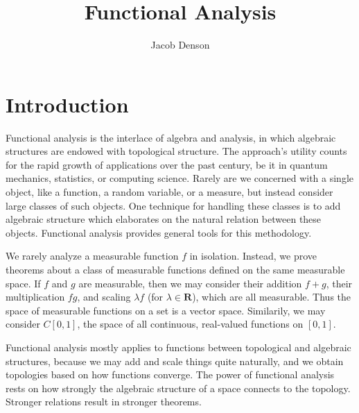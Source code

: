 

\title{Functional Analysis}
\author{Jacob Denson}



\maketitle
\tableofcontents
{}

\chapter{Introduction}

Functional analysis is the interlace of algebra and analysis, in which algebraic structures are endowed with topological structure. The approach's utility counts for the rapid growth of applications over the past century, be it in quantum mechanics, statistics, or computing science. Rarely are we concerned with a single object, like a function, a random variable, or a measure, but instead consider large classes of such objects. One technique for handling these classes is to add algebraic structure which elaborates on the natural relation between these objects. Functional analysis provides general tools for this methodology.

\begin{example}
    We rarely analyze a measurable function $f$ in isolation. Instead, we prove theorems about a class of measurable functions defined on the same measurable space. If $f$ and $g$ are measurable, then we may consider their addition $f + g$, their multiplication $fg$, and scaling $\lambda f$ (for $\lambda \in \mathbf{R}$), which are all measurable. Thus the space of measurable functions on a set is a vector space. Similarily, we may consider $C[0,1]$, the space of all continuous, real-valued functions on $[0,1]$.
\end{example}

Functional analysis mostly applies to functions between topological and algebraic structures, because we may add and scale things quite naturally, and we obtain topologies based on how functions converge. The power of functional analysis rests on how strongly the algebraic structure of a space connects to the topology. Stronger relations result in stronger theorems.

